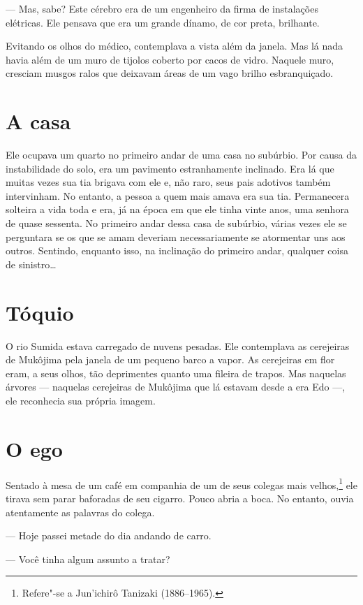 --- Mas, sabe? Este cérebro era de um engenheiro da firma de instalações
elétricas. Ele pensava que era um grande dínamo, de cor preta, brilhante.

Evitando os olhos do médico, contemplava a vista além da janela. Mas lá
nada havia além de um muro de tijolos coberto por cacos de vidro.
Naquele muro, cresciam musgos ralos que deixavam áreas de um vago
brilho esbranquiçado.

\section{A casa}

Ele ocupava um quarto no primeiro andar de uma casa no subúrbio. Por
causa da instabilidade do solo, era um pavimento estranhamente
inclinado. Era lá que muitas vezes sua tia brigava com ele e, não raro,
seus pais adotivos também intervinham. No entanto, a pessoa a quem mais
amava era sua tia. Permanecera solteira a vida toda e era, já na época
em que ele tinha vinte anos, uma senhora de quase sessenta. No primeiro
andar dessa casa de subúrbio, várias vezes ele se perguntara se os que
se amam deveriam necessariamente se atormentar uns aos outros.
Sentindo, enquanto isso, na inclinação do primeiro andar, qualquer
coisa de sinistro\ldots{}

\section{Tóquio}

O rio Sumida estava carregado de nuvens pesadas. Ele contemplava as
cerejeiras de Mukôjima pela janela de um pequeno barco a vapor. As
cerejeiras em flor eram, a seus olhos, tão deprimentes quanto uma
fileira de trapos. Mas naquelas árvores --- naquelas cerejeiras de
Mukôjima que lá estavam desde a era Edo ---, ele reconhecia sua própria
imagem.

\section{O ego}

Sentado à mesa de um café em companhia de um de seus colegas mais
velhos,\footnote{ Refere"-se a Jun'ichirô Tanizaki (1886--1965).} ele
tirava sem parar baforadas de seu cigarro. Pouco abria a boca. No
entanto, ouvia atentamente as palavras do colega.

--- Hoje passei metade do dia andando de carro.

--- Você tinha algum assunto a tratar?

